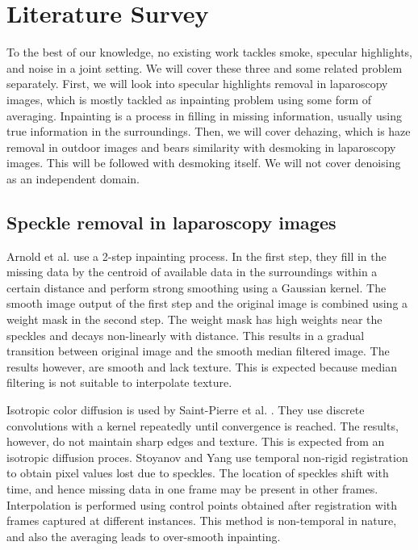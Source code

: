 
\chapter{Literature Survey}

To the best of our knowledge, no existing work tackles smoke, specular highlights, and noise in a joint setting. We will cover these three and some related problem separately. First, we will look into specular highlights removal in laparoscopy images, which is mostly tackled as inpainting problem using some form of averaging. Inpainting is a process in filling in missing information, usually using true information in the surroundings. Then, we will cover dehazing, which is haze removal in outdoor images and bears similarity with desmoking in laparoscopy images. This will be followed with desmoking itself. We will not cover denoising as an independent domain.

\section{Speckle removal in laparoscopy images}
Arnold et al.\cite{arnold2010speckle} use a 2-step inpainting process. In the first step, they fill in the missing data by the centroid of available data in the surroundings within a certain distance and perform strong smoothing using a Gaussian kernel. The smooth image output of the first step and the original image is combined using a weight mask in the second step. The weight mask has high weights near the speckles and decays non-linearly with distance. This results in a gradual transition between original image and the smooth median filtered image. The results however, are smooth and lack texture. This is expected because median filtering is not suitable to interpolate texture.

Isotropic color diffusion is used by Saint-Pierre et al. \cite{saint2011detection}. They use discrete convolutions with a kernel repeatedly until convergence is reached. The results, however, do not maintain sharp edges and texture. This is expected from an isotropic diffusion proces. Stoyanov and Yang \cite{stoyanov2005removing} use temporal non-rigid registration to obtain pixel values lost due to speckles. The location of speckles shift with time, and hence missing data in one frame may be present in other frames. Interpolation is performed using control points obtained after registration with frames captured at different instances. This method is non-temporal in nature, and also the averaging leads to over-smooth inpainting.

